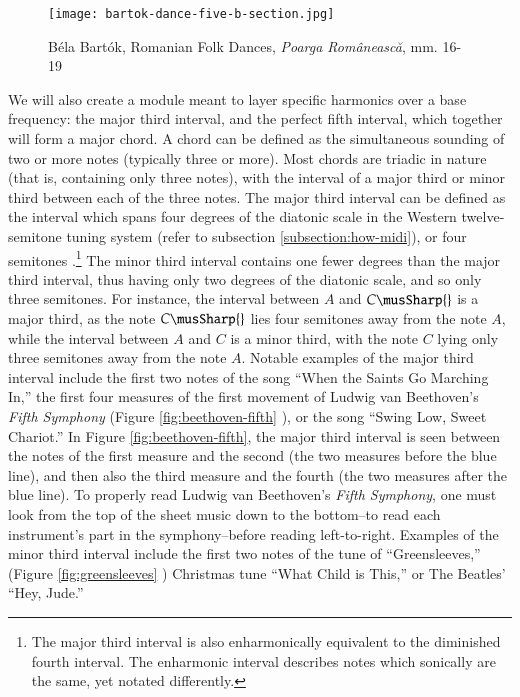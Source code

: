 \begin{figure}[h]
  \centering
  \texttt{[image: bartok-dance-five-b-section.jpg]}
  \caption{Béla Bartók, Romanian Folk Dances, \textit{Poarga Românească}, mm. 16-19}
  \label{fig:bartok-dance-five-b-section}
\end{figure}

We will also create a module meant to layer specific harmonics over a base frequency: the major third interval, and the perfect fifth interval, which together will form a major chord. A chord can be defined as the simultaneous sounding of two or more notes (typically three or more). Most chords are triadic in nature (that is, containing only three notes), with the interval of a major third or minor third between each of the three notes. The major third interval can be defined as the interval which spans four degrees of the diatonic scale in the Western twelve-semitone tuning system (refer to subsection \ref{subsection:how-midi}), or four semitones \cite{Nave_2017}.\footnote{The major third interval is also enharmonically equivalent to the diminished fourth interval. The enharmonic interval describes notes which sonically are the same, yet notated differently.} The minor third interval contains one fewer degrees than the major third interval, thus having only two degrees of the diatonic scale, and so only three semitones. For instance, the interval between $A$ and $C\musSharp{}$ is a major third, as the note $C\musSharp{}$ lies four semitones away from the note $A$, while the interval between $A$ and $C$ is a minor third, with the note $C$ lying only three semitones away from the note $A$. Notable examples of the major third interval include the first two notes of the song ``When the Saints Go Marching In,'' the first four measures of the first movement of Ludwig van Beethoven's \textit{Fifth Symphony} (Figure \ref{fig:beethoven-fifth} \cite{Beethoven_1862}), or the song ``Swing Low, Sweet Chariot.'' In Figure \ref{fig:beethoven-fifth}, the major third interval is seen between the notes of the first measure and the second (the two measures before the blue line), and then also the third measure and the fourth (the two measures after the blue line). To properly read Ludwig van Beethoven's \textit{Fifth Symphony}, one must look from the top of the sheet music down to the bottom--to read each instrument's part in the symphony--before reading left-to-right. Examples of the minor third interval include the first two notes of the tune of ``Greensleeves,'' (Figure \ref{fig:greensleeves} \cite{Kurtz_2010}) Christmas tune ``What Child is This,'' or The Beatles' ``Hey, Jude.''

